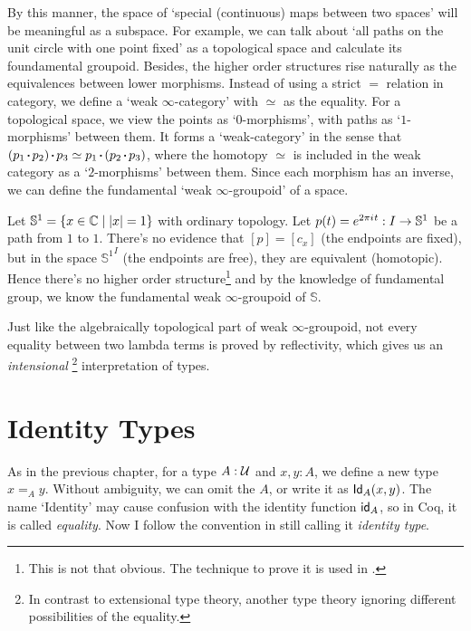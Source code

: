By this manner, the space of `special (continuous) maps between two
spaces' will be meaningful as a subspace. For example, we can talk about
`all paths on the unit circle with one point fixed' as a topological space
and calculate its foundamental groupoid. Besides, the higher order structures
rise naturally as the equivalences between lower morphisms. Instead of
using a strict $=$ relation in category, we define a `weak $\infty$-category'
with $\simeq$ as the equality. For a topological space, we view the
points as `$0$-morphisms', with paths as `$1$-morphisms' between them. It
forms a `weak-category' in the sense that 
$(p_1\concat p_2)\concat p_3\simeq p_1\concat(p_2\concat p_3)$,
where the homotopy $\simeq$ is included in the weak category as a 
`$2$-morphisms' between them. Since each morphism has an inverse, we
can define the fundamental `weak $\infty$-groupoid' of a space. 

\newcommand{\sphere}{\mathbb{S}}
\begin{example}
    Let $\sphere^1=\{x\in\complex\mid |x| = 1\}$ with ordinary 
    topology. Let $p(t) = e^{2\pi\iu t}: I\to \sphere^1$ be a path from
    $1$ to $1$. There's no evidence that $[p]=[c_x]$ (the endpoints are 
    fixed), but in the space ${\sphere^1}^I$ (the endpoints are free), 
    they are equivalent (homotopic). Hence there's no higher order
    structure\footnote{This is not that obvious. The technique to prove
    it is used in \cite{homotopy-type-theory}.} 
    and by the knowledge of fundamental group, we know the fundamental
    weak $\infty$-groupoid of $\sphere$.
\end{example}

Just like the algebraically topological
part of weak $\infty$-groupoid, not every equality between two lambda
terms is proved by reflectivity, which gives us an {\it intensional}
\footnote{In contrast to extensional type theory, another type theory
ignoring different possibilities of the equality.} interpretation of types.

\section{Identity Types}

As in the previous chapter, for a type $A:\mathcal{U}$ and $x,y:A$,
we define a new type $x =_A y$. Without ambiguity, we can omit the $A$,
or write it as $\text{\sf Id}_A(x, y)$. The name `Identity' may cause confusion with
the identity function $\text{\sf id}_A$, so in Coq\cite{coq}, it is called {\it 
equality}. Now I follow the convention in \cite{homotopy-type-theory} still
calling it {\it identity type}.

